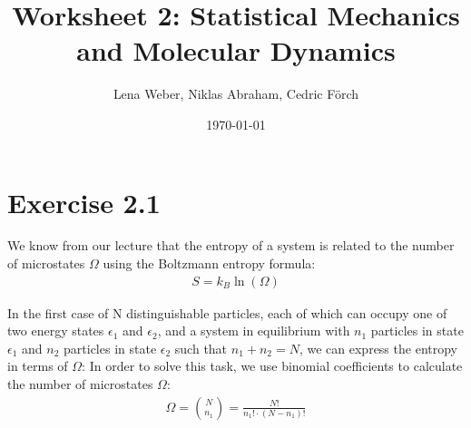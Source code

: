 \documentclass[a4paper,11pt,bibtotoc]{scrartcl}
\begin{document}
\titlehead{Simulation Methods in Physics I \hfill WS 2021/2022}
\title{Worksheet 2: Statistical Mechanics and Molecular Dynamics}
\author{Lena Weber, Niklas Abraham, Cedric Förch}
\date{\today}
\publishers{Institute for Computational Physics, University of
  Stuttgart}
\maketitle

\tableofcontents

\section{Exercise 2.1}

We know from our lecture that the entropy of a system is related to the number of microstates $\Omega$ using the Boltzmann entropy formula:
\begin{align}
	S = k_B \ln(\Omega)
\end{align}

In the first case of N distinguishable particles, each of which can occupy one of two energy states $\epsilon_1$ and $\epsilon_2$, and a system in equilibrium with $n_1$ particles in state $\epsilon_1$ and $n_2$ particles in state $\epsilon_2$ such that $n_1 + n_2 = N$, we can express the entropy in terms of $\Omega$:
In order to solve this task, we use binomial coefficients to calculate the number of microstates $\Omega$:
\begin{align}
	\Omega = \binom{N}{n_1} = \frac{N!}{n_1! \cdot (N - n_1)!} \\
\end{align}
\end{document}
